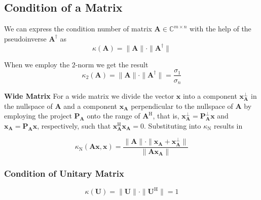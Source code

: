 \documentclass[english]{latex4ei/latex4ei_sheet}
\begin{document}
\begin{sectionbox}
    \subsection{Condition of a Matrix}
    We can express the condition number of matrix $\mathbf{A}\in\mathbb{C}^{m \times n}$ with the help of the pseudoinverse $\mathbf{A}^\dagger$ as
    $$\kappa(\mathbf{A}) = \parallel\mathbf{A}\parallel\cdot\parallel \mathbf{A}^\dagger\parallel$$

    When we employ the $2$-norm we get the result
    $$\kappa_2(\mathbf{A}) = \parallel\mathbf{A}\parallel\cdot\parallel \mathbf{A}^\dagger\parallel = \frac{\sigma_1}{\sigma_n}$$

    \textbf{Wide Matrix}
    For a wide matrix we divide the vector $\mathbf{x}$ into a component $\mathbf{x}^\perp_\mathbf{A}$ in the nullspace of $\mathbf{A}$ and a component $\mathbf{x}_\mathbf{A}$ perpendicular to the nullspace of $\mathbf{A}$ by employing the project $\mathbf{P}_\mathbf{A}$ onto the range of $\mathbf{A}^\text{H}$, that is, $\mathbf{x}^\perp_\mathbf{A} = \mathbf{P}^\perp_\mathbf{A}\mathbf{x}$ and $\mathbf{x}_\mathbf{A} = \mathbf{P}_\mathbf{A}\mathbf{x}$, respectively, such that $\mathbf{x}^\text{H}_\mathbf{A}\mathbf{x}_\mathbf{A} = 0$. Substituting into $\kappa_\text{N}$ results in

    $$\kappa_\text{N}(\mathbf{A}\mathbf{x}, \mathbf{x}) = \frac{\parallel\mathbf{A}\parallel\cdot\parallel\mathbf{x}_\mathbf{A} + \mathbf{x}^\perp_\mathbf{A}\parallel}{\parallel\mathbf{A}\mathbf{x}_\mathbf{A}\parallel}$$

    \subsubsection{Condition of Unitary Matrix}
    $$\kappa(\mathbf{U}) = \parallel\mathbf{U}\parallel\cdot\parallel \mathbf{U}^\text{H}\parallel = 1$$
\end{sectionbox}
\end{document}
